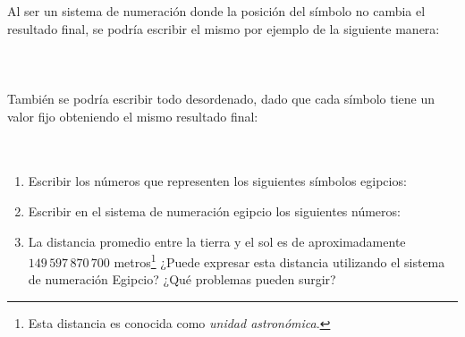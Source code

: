 \documentclass[12pt]{article}
\begin{document}
Al ser un sistema de numeración donde la posición del símbolo no cambia el resultado final, se podría escribir el mismo por ejemplo de la siguiente manera:\\\\
 \\\\
También se podría escribir todo desordenado, dado que cada símbolo tiene un valor fijo obteniendo el mismo resultado final:\\\\
 \\

\begin{enumerate}[resume]

    \item Escribir los números que representen los siguientes símbolos
        egipcios:


    \item Escribir en el sistema de numeración egipcio los siguientes números:


    \item La distancia promedio entre la tierra y el sol es de aproximadamente
        $149\,597\,870\,700$ metros\footnote{Esta distancia es conocida como
        \emph{unidad astronómica}.} ¿Puede expresar esta distancia utilizando
        el sistema de numeración Egipcio? ¿Qué problemas pueden surgir?

\end{enumerate}
\end{document}
